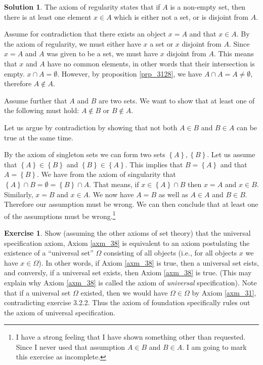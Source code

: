 \documentclass[a4paper, twocolumn]{report}
\newcounter{exercise} \numberwithin{exercise}{section}
\theoremstyle{definition}
\newtheorem{exc}[exercise]{Exercise}
\theoremstyle{solution}
\newtheorem*{sltn}{Solution}
\newcommand{\intrsct}{\cap}
\begin{document}
\begin{sltn}
  The axiom of regularity states that if $A$ is a non-empty set, then there is
  at least one element $x \in A$ which is either not a set, or is disjoint from
  $A$.

  Assume for contradiction that there exists an object $x = A$ and that $x \in
  A$. By the axiom of regularity, we must either have $x$ a set or $x$ disjoint
  from $A$. Since $x = A$ and $A$ was given to be a set, we must have $x$
  disjoint from $A$. This means that $x$ and $A$ have no common elements, in
  other words that their intersection is empty. $x \intrsct A = \emptyset$.
  However, by proposition \ref{prp_3128}, we have $A \intrsct A = A \neq
  \emptyset$, therefore $A \notin A$.

  Assume further that $A$ and $B$ are two sets. We want to show that at least
  one of the following must hold: $A \notin B$ or $B \notin A$.

  Let us argue by contradiction by showing that not both $A \in B$ and $B \in
  A$ can be true at the same time.

  By the axiom of singleton sets we can form two sets $\left\{ A \right\},
  \left\{ B \right\}$.  Let us assume that $\left\{ A \right\} \in \left\{ B
  \right\}$ and $\left\{ B \right\} \in \left\{ A \right\}$.  This implies that
  $B = \left\{ A \right\}$ and that $A = \left\{ B \right\}$.  We have from the
  axiom of singularity that $\left\{ A \right\} \intrsct B = \emptyset =
  \left\{ B \right\} \intrsct A$.  That means, if $x \in \left\{ A \right\}
  \intrsct B$ then $x = A$ and $x \in B$. Similarly, $x = B$ and $x \in A$.  We
  now have $A = B$ as well as $A \in A$ and $B \in B$. Therefore our assumption
  must be wrong. We can then conclude that at least one of the assumptions must
  be wrong.\footnote{I have a strong feeling that I have shown something other
    than requested. Since I never used that assumption $A \in B$ and $B \in A$. I
  am going to mark this exercise as incomplete.}

\end{sltn}

\begin{exc}
  Show (assuming the other axioms of set theory) that the universal
  specification axiom, Axiom \ref{axm_38} is equivalent to an axiom postulating
  the existence of a ``universal set'' $\Omega$ consisting of all objects
  (i.e., for all objects $x$ we have $x \in \Omega$). In other words, if Axiom
  \ref{axm_38} is true, then a universal set eists, and conversly, if a
  universal set exists, then Axiom \ref{axm_38} is true. (This may explain why
  Axiom \ref{axm_38} is called the axiom of \textit{universal} specification).
  Note that if a universal set $\Omega$ existed, then we would have $\Omega \in
  \Omega$ by Axiom \ref{axm_31}, contradicting exercise 3.2.2. Thus the axiom
  of foundation specifically rules out the axiom of universal specification.
\end{exc}
\end{document}

